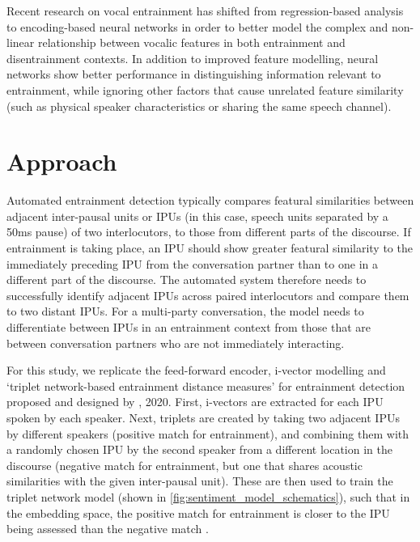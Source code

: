     Recent research on vocal entrainment has shifted from regression-based analysis to encoding-based neural networks in order to better model the complex and non-linear relationship between vocalic features in both entrainment and disentrainment contexts. In addition to improved feature modelling, neural networks show better performance in distinguishing information relevant to entrainment, while ignoring other factors that cause unrelated feature similarity (such as physical speaker characteristics or sharing the same speech channel)\parencite{nasir2020}.

\section{Approach}

    Automated entrainment detection typically compares featural similarities between adjacent inter-pausal units or IPUs (in this case, speech units separated by a 50ms pause) of two interlocutors, to those from different parts of the discourse. If entrainment is taking place, an IPU should show greater featural similarity to the immediately preceding IPU from the conversation partner than to one in a different part of the discourse. The automated system therefore needs to successfully identify adjacent IPUs across paired interlocutors and compare them to two distant IPUs. For a multi-party conversation, the model needs to differentiate between IPUs in an entrainment context from those that are between conversation partners who are not immediately interacting.

    For this study, we replicate the feed-forward encoder, i-vector modelling and `triplet network-based entrainment distance measures' for entrainment detection proposed and designed by \citeauthor{nasir2020}, 2020. First, i-vectors are extracted for each IPU spoken by each speaker. Next, triplets are created by taking two adjacent IPUs by different speakers (positive match for entrainment), and combining them with a randomly chosen IPU by the second speaker from a different location in the discourse (negative match for entrainment, but one that shares acoustic similarities with the given inter-pausal unit). These are then used to train the triplet network model (shown in \ref{fig:sentiment_model_schematics}), such that in the embedding space, the positive match for entrainment is closer to the IPU being assessed than the negative match \cite{hoffer2015deep}.


